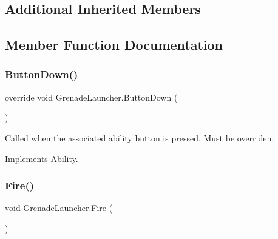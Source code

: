 \subsection*{Additional Inherited Members}


\subsection{Member Function Documentation}
\hypertarget{class_grenade_launcher_aad701030a96f84c21b002276247b5b9b}{}\label{class_grenade_launcher_aad701030a96f84c21b002276247b5b9b} 
\subsubsection{\texorpdfstring{Button\+Down()}{ButtonDown()}}
{\footnotesize\ttfamily override void Grenade\+Launcher.\+Button\+Down (\begin{DoxyParamCaption}{ }\end{DoxyParamCaption})\hspace{0.3cm}{\ttfamily [virtual]}}



Called when the associated ability button is pressed. Must be overriden. 



Implements \hyperlink{class_ability_a7722265862f8b29828315725415ce266}{Ability}.

\hypertarget{class_grenade_launcher_a15da3bc60ea91ec299c87f8f28e5d30a}{}\label{class_grenade_launcher_a15da3bc60ea91ec299c87f8f28e5d30a} 
\subsubsection{\texorpdfstring{Fire()}{Fire()}}
{\footnotesize\ttfamily void Grenade\+Launcher.\+Fire (\begin{DoxyParamCaption}{ }\end{DoxyParamCaption})}





\hypertarget{class_grenade_launcher_a4886ca94e7f3d8e3b0ddf23b0d8aaffe}{}\label{class_grenade_launcher_a4886ca94e7f3d8e3b0ddf23b0d8aaffe} 

